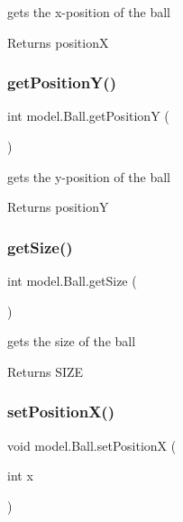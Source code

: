 gets the x-\/position of the ball 

\begin{DoxyReturn}{Returns}
positionX 
\end{DoxyReturn}
\hypertarget{classmodel_1_1_ball_ae5509de430dc00bc02259294aa05c10d}{}\label{classmodel_1_1_ball_ae5509de430dc00bc02259294aa05c10d} 
\subsubsection{\texorpdfstring{get\+Position\+Y()}{getPositionY()}}
{\footnotesize\ttfamily int model.\+Ball.\+get\+PositionY (\begin{DoxyParamCaption}{ }\end{DoxyParamCaption})}



gets the y-\/position of the ball 

\begin{DoxyReturn}{Returns}
positionY 
\end{DoxyReturn}
\hypertarget{classmodel_1_1_ball_a46ca8051579a49ae750f965621534d5c}{}\label{classmodel_1_1_ball_a46ca8051579a49ae750f965621534d5c} 
\subsubsection{\texorpdfstring{get\+Size()}{getSize()}}
{\footnotesize\ttfamily int model.\+Ball.\+get\+Size (\begin{DoxyParamCaption}{ }\end{DoxyParamCaption})}



gets the size of the ball 

\begin{DoxyReturn}{Returns}
S\+I\+ZE 
\end{DoxyReturn}
\hypertarget{classmodel_1_1_ball_a14854352d44495abed0928ba16a0ac39}{}\label{classmodel_1_1_ball_a14854352d44495abed0928ba16a0ac39} 
\subsubsection{\texorpdfstring{set\+Position\+X()}{setPositionX()}}
{\footnotesize\ttfamily void model.\+Ball.\+set\+PositionX (\begin{DoxyParamCaption}\item[{int}]{x }\end{DoxyParamCaption})}




